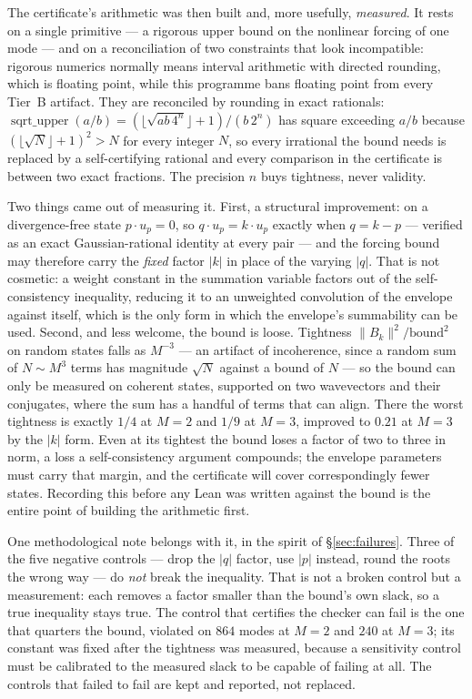 \documentclass[11pt,a4paper]{article}
\theoremstyle{definition}
\theoremstyle{plain}
\begin{document}
The certificate's arithmetic was then built and, more usefully, \emph{measured}. It rests on a
single primitive --- a rigorous upper bound on the nonlinear forcing of one mode --- and on a
reconciliation of two constraints that look incompatible: rigorous numerics normally means
interval arithmetic with directed rounding, which is floating point, while this programme bans
floating point from every Tier~B artifact. They are reconciled by rounding in exact rationals:
$\operatorname{sqrt\_upper}(a/b) = (\lfloor\sqrt{ab\,4^n}\rfloor + 1)/(b\,2^n)$ has square
exceeding $a/b$ because $(\lfloor\sqrt N\rfloor+1)^2 > N$ for every integer $N$, so every
irrational the bound needs is replaced by a self-certifying rational and every comparison in
the certificate is between two exact fractions. The precision $n$ buys tightness, never
validity.

Two things came out of measuring it. First, a structural improvement: on a divergence-free
state $p\cdot u_p = 0$, so $q\cdot u_p = k\cdot u_p$ exactly when $q = k-p$ --- verified as an
exact Gaussian-rational identity at every pair --- and the forcing bound may therefore carry
the \emph{fixed} factor $|k|$ in place of the varying $|q|$. That is not cosmetic: a weight
constant in the summation variable factors out of the self-consistency inequality, reducing it
to an unweighted convolution of the envelope against itself, which is the only form in which
the envelope's summability can be used. Second, and less welcome, the bound is loose. Tightness
$\|B_k\|^2/\text{bound}^2$ on random states falls as $M^{-3}$ --- an artifact of incoherence,
since a random sum of $N\sim M^3$ terms has magnitude $\sqrt N$ against a bound of $N$ --- so
the bound can only be measured on coherent states, supported on two wavevectors and their
conjugates, where the sum has a handful of terms that can align. There the worst tightness is
exactly $1/4$ at $M=2$ and $1/9$ at $M=3$, improved to $0.21$ at $M=3$ by the $|k|$ form. Even
at its tightest the bound loses a factor of two to three in norm, a loss a self-consistency
argument compounds; the envelope parameters must carry that margin, and the certificate will
cover correspondingly fewer states. Recording this before any Lean was written against the
bound is the entire point of building the arithmetic first.

One methodological note belongs with it, in the spirit of \S\ref{sec:failures}. Three of the
five negative controls --- drop the $|q|$ factor, use $|p|$ instead, round the roots the wrong
way --- do \emph{not} break the inequality. That is not a broken control but a measurement:
each removes a factor smaller than the bound's own slack, so a true inequality stays true. The
control that certifies the checker can fail is the one that quarters the bound, violated on
$864$ modes at $M=2$ and $240$ at $M=3$; its constant was fixed after the tightness was
measured, because a sensitivity control must be calibrated to the measured slack to be capable
of failing at all. The controls that failed to fail are kept and reported, not replaced.
\end{document}
